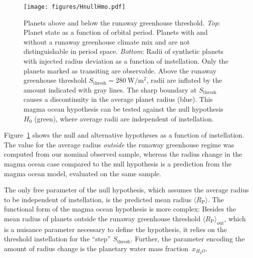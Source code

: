 \documentclass[modern]{aastex631}
\begin{document}
\begin{figure}
    \begin{centering}
        \texttt{[image: figures/HnullHmo.pdf]}
        \caption{Planets above and below the runaway greenhouse threshold.
        \textit{Top}: Planet state as a function of orbital period. Planets with and without a runaway greenhouse climate mix and are not distinguishable in period space.
        \textit{Bottom}: Radii of synthetic planets with injected radius deviation as a function of instellation. Only the planets marked as transiting are observable. Above the runaway greenhouse threshold $S_\mathrm{thresh} =\SI{280}{\watt\per\meter\squared} $, radii are inflated by the amount indicated with gray lines. The sharp boundary at $S_\mathrm{thresh}$ causes a discontinuity in the average planet radius (blue). This magma ocean hypothesis can be tested against the null hypothesis $H_0$ (green), where average radii are independent of instellation.}
        \label{fig:HnullHmo}
    \end{centering}
\end{figure}
    Figure~\ref{fig:HnullHmo} shows the null and alternative hypotheses as a function of instellation.
    The value for the average radius \textit{outside} the runaway greenhouse regime was computed from our nominal observed sample, whereas the radius change in the magma ocean case compared to the null hypothesis is a prediction from the magma ocean model, evaluated on the same sample.

\begin{note}
    The only free parameter of the null hypothesis, which assumes the average radius to be independent of instellation, is the predicted mean radius $\langle R_\mathrm{P}\rangle $.
    The functional form of the magma ocean hypothesis is more complex: Besides the mean radius of planets outside the runaway greenhouse threshold $\langle R_\mathrm{P}\rangle_\mathrm{out}$, which is a nuisance parameter necessary to define the hypothesis, it relies on the threshold instellation for the ``step'' $S_\mathrm{thresh}$.
    Further, the parameter encoding the amount of radius change is the planetary water mass fraction~$x_{H_2O}$.
\end{note}
\end{document}
